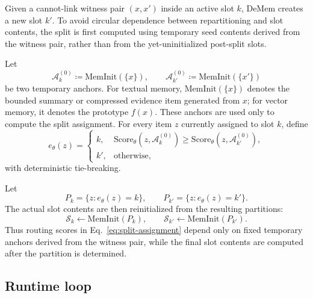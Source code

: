 \documentclass{article}
\newcommand{\MemInit}{\mathrm{MemInit}}
\theoremstyle{plain}
\theoremstyle{definition}
\theoremstyle{remark}
\newcommand{\Score}{\mathrm{Score}}
\begin{document}
Given a cannot-link witness pair \((x,x')\) inside an active slot \(k\),
DeMem creates a new slot \(k'\). To avoid circular dependence
between repartitioning and slot contents, the split is first computed using
temporary seed contents derived from the witness pair, rather than from the
yet-uninitialized post-split slots.

Let
\[
\mathcal A_k^{(0)}
\coloneqq
\MemInit(\{x\}),
\qquad
\mathcal A_{k'}^{(0)}
\coloneqq
\MemInit(\{x'\})
\]
be two temporary anchors. For textual memory, \(\MemInit(\{x\})\) denotes
the bounded summary or compressed evidence item generated from \(x\); for
vector memory, it denotes the prototype \(f(x)\). These anchors are used
only to compute the split assignment. For every item \(z\) currently assigned
to slot \(k\), define
\begin{equation}
\label{eq:split-assignment}
e_\theta(z)
=
\begin{cases}
k,
&
\Score_\theta(z,\mathcal A_k^{(0)})
\ge
\Score_\theta(z,\mathcal A_{k'}^{(0)}),
\\
k',
&
\text{otherwise},
\end{cases}
\end{equation}
with deterministic tie-breaking.

Let
\[
P_k=\{z:e_\theta(z)=k\},
\qquad
P_{k'}=\{z:e_\theta(z)=k'\}.
\]
The actual slot contents are then reinitialized from the resulting
partitions:
\[
\mathcal S_k
\gets
\MemInit(P_k),
\qquad
\mathcal S_{k'}
\gets
\MemInit(P_{k'}).
\]
Thus routing scores in Eq.~\eqref{eq:split-assignment} depend only on fixed
temporary anchors derived from the witness pair, while the final slot
contents are computed after the partition is determined.

\subsection{Runtime loop}
\label{app:runtime-loop}
\end{document}
